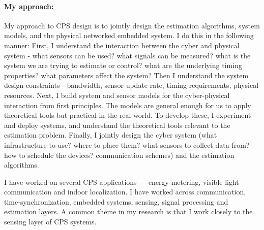 \documentclass[10pt]{article}
\begin{document}

\paragraph{My approach:}
My approach to CPS design is to jointly design the estimation
algorithms, system models, and the physical networked embedded
system. I do this in the following manner: First, I understand the
interaction between the cyber and physical system - what sensors can
be used? what signals can be measured? what is the system we are
trying to estimate or control? what are the underlying timing
properties? what parameters affect the system? Then I understand the
system design constraints - bandwidth, sensor update rate, timing
requirements, physical resources. Next, I build system and sensor
models for the cyber-physical interaction from first principles. The
models are general enough for us to apply theoretical tools but
practical in the real world. To develop these, I experiment and deploy
systems, and understand the theoretical tools relevant to the
estimation problem. Finally, I jointly design the cyber system (what
infrastructure to use? where to place them? what sensors to collect
data from? how to schedule the devices? communication schemes) and the
estimation algorithms.

I have worked on several CPS applications --- energy metering, visible
light communication and indoor localization. I have worked across
communication, time-synchronization, embedded systems, sensing, signal
processing and estimation layers. A common theme in my research is
that I work closely to the sensing layer of CPS systems.



\end{document}
